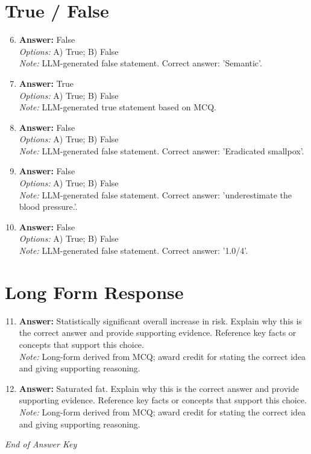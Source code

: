 \documentclass[12pt]{article}
\begin{document}
\section*{True / False}
\begin{enumerate}[label=\arabic*.]
\setcounter{enumi}{5}
\item \textbf{Answer:} False
\\ \textit{Options:} A) True; B) False
\\ \textit{Note:} LLM-generated false statement. Correct answer: 'Semantic'.
\item \textbf{Answer:} True
\\ \textit{Options:} A) True; B) False
\\ \textit{Note:} LLM-generated true statement based on MCQ.
\item \textbf{Answer:} False
\\ \textit{Options:} A) True; B) False
\\ \textit{Note:} LLM-generated false statement. Correct answer: 'Eradicated smallpox'.
\item \textbf{Answer:} False
\\ \textit{Options:} A) True; B) False
\\ \textit{Note:} LLM-generated false statement. Correct answer: 'underestimate the blood pressure.'.
\item \textbf{Answer:} False
\\ \textit{Options:} A) True; B) False
\\ \textit{Note:} LLM-generated false statement. Correct answer: '1.0/4'.
\end{enumerate}

\section*{Long Form Response}
\begin{enumerate}[label=\arabic*.]
\setcounter{enumi}{10}
\item \textbf{Answer:} Statistically significant overall increase in risk. Explain why this is the correct answer and provide supporting evidence. Reference key facts or concepts that support this choice.
\\ \textit{Note:} Long-form derived from MCQ; award credit for stating the correct idea and giving supporting reasoning.
\item \textbf{Answer:} Saturated fat. Explain why this is the correct answer and provide supporting evidence. Reference key facts or concepts that support this choice.
\\ \textit{Note:} Long-form derived from MCQ; award credit for stating the correct idea and giving supporting reasoning.
\end{enumerate}

\vfill
\noindent\textit{End of Answer Key}
\end{document}
